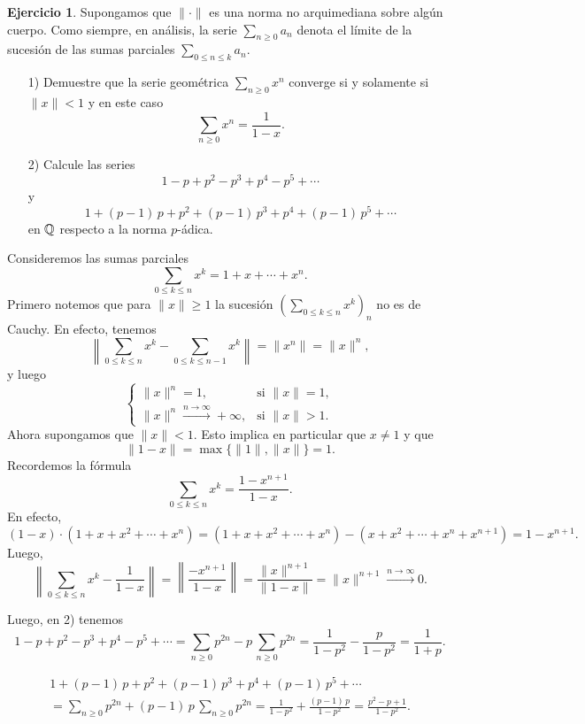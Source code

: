 \documentclass{article}
\numberwithin{equation}{section}
\theoremstyle{definition}
\newtheorem{ejerc}{Ejercicio}
\begin{document}
\begin{ejerc}
  Supongamos que $\|\cdot\|$ es una norma no arquimediana sobre algún
  cuerpo. Como siempre, en análisis, la serie $\sum_{n\ge 0} a_n$ denota
  el límite de la sucesión de las sumas parciales $\sum_{0\le n\le k} a_n$.

  \begin{enumerate}
  \item[1)] Demuestre que la serie geométrica $\sum_{n\ge 0} x^n$ converge
    si y solamente si $\|x\| < 1$ y en este caso
    $$\sum_{n\ge 0} x^n = \frac{1}{1-x}.$$

  \item[2)] Calcule las series
    $$1 - p + p^2 - p^3 + p^4 - p^5 + \cdots$$
    y
    $$1 + (p-1)\,p + p^2 + (p-1)\,p^3 + p^4 + (p-1)\,p^5 + \cdots$$
    en $\mathbb{Q}$ respecto a la norma $p$-ádica.
  \end{enumerate}

  \ifdefined\solutions\begin{solucion}
    Consideremos las sumas parciales
    $$\sum_{0 \le k \le n} x^k = 1 + x + \cdots + x^n.$$
    Primero notemos que para $\|x\| \ge 1$ la sucesión
    $(\sum_{0 \le k \le n} x^k)_n$ no es de Cauchy. En efecto, tenemos
    \[ \left\|\sum_{0 \le k \le n} x^k - \sum_{0 \le k \le n-1} x^k\right\| =
       \|x^n\| = \|x\|^n, \]
    y luego
    $$\begin{cases}
      \|x\|^n = 1, & \text{si } \|x\| = 1,\\
      \|x\|^n \xrightarrow{n\to\infty} +\infty, & \text{si } \|x\| > 1.
    \end{cases}$$
    Ahora supongamos que $\|x\| < 1$. Esto implica en particular que $x \ne 1$
    y que
    $$\|1 - x\| = \max \{ \|1\|, \|x\| \} = 1.$$
    Recordemos la fórmula
    $$\sum_{0 \le k \le n} x^k = \frac{1 - x^{n+1}}{1 - x}.$$
    En efecto,
    \[ (1 - x)\cdot (1 + x + x^2 + \cdots + x^n) =
       (1 + x + x^2 + \cdots + x^n) - (x + x^2 + \cdots + x^n + x^{n+1}) =
       1 - x^{n+1}. \]
    Luego,
    \[ \left\|\sum_{0 \le k \le n} x^k - \frac{1}{1-x}\right\| =
       \left\|\frac{-x^{n+1}}{1 - x}\right\| = \frac{\|x\|^{n+1}}{\|1-x\|} =
       \|x\|^{n+1} \xrightarrow{n \to \infty} 0. \]

    Luego, en 2) tenemos
    \[ 1 - p + p^2 - p^3 + p^4 - p^5 + \cdots =
       \sum_{n\ge 0} p^{2n} - p\,\sum_{n\ge 0} p^{2n} =
       \frac{1}{1-p^2} - \frac{p}{1-p^2} = \frac{1}{1+p}. \]

    \begin{multline*}
      1 + (p-1)\,p + p^2 + (p-1)\,p^3 + p^4 + (p-1)\,p^5 + \cdots \\
    = \sum_{n\ge 0} p^{2n} + (p-1)\,p\,\sum_{n\ge 0} p^{2n} =
      \frac{1}{1-p^2} + \frac{(p-1)\,p}{1-p^2} =
      \frac{p^2-p+1}{1-p^2}.
    \end{multline*}
  \end{solucion}\fi
\end{ejerc}
\end{document}
